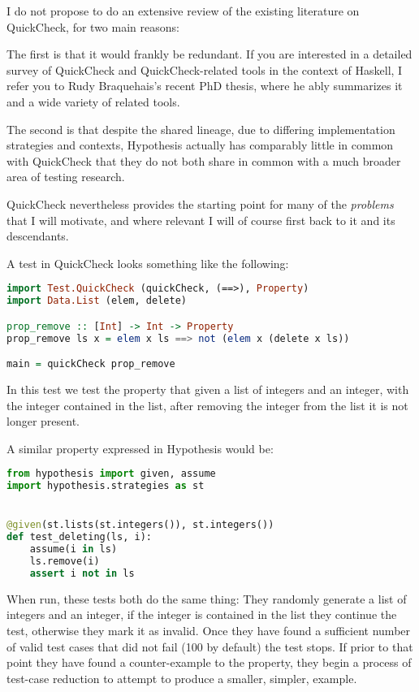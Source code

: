 I do not propose to do an extensive review of the existing literature on QuickCheck,
for two main reasons:

The first is that it would frankly be redundant.
If you are interested in a detailed survey of QuickCheck and QuickCheck-related tools in the context of Haskell,
I refer you to Rudy Braquehais's recent PhD thesis\cite{matela2017tools},
where he ably summarizes it and a wide variety of related tools.

The second is that despite the shared lineage,
due to differing implementation strategies and contexts,
Hypothesis actually has comparably little in common with QuickCheck that they do not both share in common with a much broader area of testing research.

QuickCheck nevertheless provides the starting point for many of the \emph{problems} that I will motivate,
and where relevant I will of course first back to it and its descendants.

A test in QuickCheck looks something like the following:

\begin{lstlisting}[language=Haskell]
import Test.QuickCheck (quickCheck, (==>), Property)
import Data.List (elem, delete)

prop_remove :: [Int] -> Int -> Property
prop_remove ls x = elem x ls ==> not (elem x (delete x ls))

main = quickCheck prop_remove
\end{lstlisting}

In this test we test the property that given a list of integers and an integer,
with the integer contained in the list,
after removing the integer from the list it is not longer present.

A similar property expressed in Hypothesis would be:

\begin{lstlisting}[language=Python]
from hypothesis import given, assume
import hypothesis.strategies as st


@given(st.lists(st.integers()), st.integers())
def test_deleting(ls, i):
    assume(i in ls)
    ls.remove(i)
    assert i not in ls
\end{lstlisting}

When run, these tests both do the same thing:
They randomly generate a list of integers and an integer,
if the integer is contained in the list they continue the test,
otherwise they mark it as invalid.
Once they have found a sufficient number of valid test cases that did not fail (100 by default) the test stops.
If prior to that point they have found a counter-example to the property,
they begin a process of test-case reduction to attempt to produce a smaller, simpler, example.

